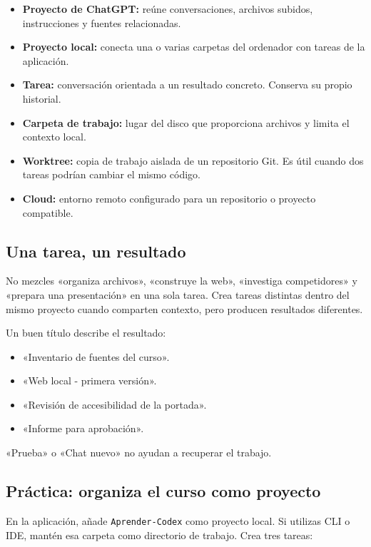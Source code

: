 \documentclass[10pt,a4paper,openany]{book}
\providecommand{\tightlist}{\setlength{\itemsep}{0.18em}\setlength{\parskip}{0pt}}
\begin{document}
\begin{itemize}
\tightlist
\item
  \textbf{Proyecto de ChatGPT:} reúne conversaciones, archivos subidos,
  instrucciones y fuentes relacionadas.
\item
  \textbf{Proyecto local:} conecta una o varias carpetas del ordenador
  con tareas de la aplicación.
\item
  \textbf{Tarea:} conversación orientada a un resultado concreto.
  Conserva su propio historial.
\item
  \textbf{Carpeta de trabajo:} lugar del disco que proporciona archivos
  y limita el contexto local.
\item
  \textbf{Worktree:} copia de trabajo aislada de un repositorio Git. Es
  útil cuando dos tareas podrían cambiar el mismo código.
\item
  \textbf{Cloud:} entorno remoto configurado para un repositorio o
  proyecto compatible.
\end{itemize}

\subsection{Una tarea, un resultado}\label{una-tarea-un-resultado}

No mezcles «organiza archivos», «construye la web», «investiga
competidores» y «prepara una presentación» en una sola tarea. Crea
tareas distintas dentro del mismo proyecto cuando comparten contexto,
pero producen resultados diferentes.

Un buen título describe el resultado:

\begin{itemize}
\tightlist
\item
  «Inventario de fuentes del curso».
\item
  «Web local - primera versión».
\item
  «Revisión de accesibilidad de la portada».
\item
  «Informe para aprobación».
\end{itemize}

«Prueba» o «Chat nuevo» no ayudan a recuperar el trabajo.

\subsection{Práctica: organiza el curso como
proyecto}\label{pruxe1ctica-organiza-el-curso-como-proyecto}

En la aplicación, añade \texttt{Aprender-Codex} como proyecto local. Si
utilizas CLI o IDE, mantén esa carpeta como directorio de trabajo. Crea
tres tareas:
\end{document}
